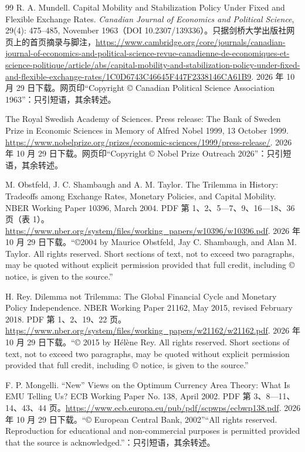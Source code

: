 \begin{thebibliography}{99}
 R. A. Mundell. Capital Mobility and Stabilization Policy Under Fixed and Flexible Exchange Rates. \emph{Canadian Journal of Economics and Political Science}, 29(4): 475--485, November 1963（DOI 10.2307/139336）。只据剑桥大学出版社网页上的首页摘录与脚注，\url{https://www.cambridge.org/core/journals/canadian-journal-of-economics-and-political-science-revue-canadienne-de-economiques-et-science-politique/article/abs/capital-mobility-and-stabilization-policy-under-fixed-and-flexible-exchange-rates/1C0D6743C46645F447F2338146CA61B9}. 2026 年 10 月 29 日下载。网页印“Copyright © Canadian Political Science Association 1963”：只引短语，其余转述。

 The Royal Swedish Academy of Sciences. Press release: The Bank of Sweden Prize in Economic Sciences in Memory of Alfred Nobel 1999, 13 October 1999. \url{https://www.nobelprize.org/prizes/economic-sciences/1999/press-release/}. 2026 年 10 月 29 日下载。网页印“Copyright © Nobel Prize Outreach 2026”：只引短语，其余转述。

 M. Obstfeld, J. C. Shambaugh and A. M. Taylor. The Trilemma in History: Tradeoffs among Exchange Rates, Monetary Policies, and Capital Mobility. NBER Working Paper 10396, March 2004. PDF 第 1、2、5—7、9、16—18、36 页（表 1）。\url{https://www.nber.org/system/files/working_papers/w10396/w10396.pdf}. 2026 年 10 月 29 日下载。“©2004 by Maurice Obstfeld, Jay C. Shambaugh, and Alan M. Taylor. All rights reserved. Short sections of text, not to exceed two paragraphs, may be quoted without explicit permission provided that full credit, including © notice, is given to the source.”

 H. Rey. Dilemma not Trilemma: The Global Financial Cycle and Monetary Policy Independence. NBER Working Paper 21162, May 2015, revised February 2018. PDF 第 1、2、19、22 页。\url{https://www.nber.org/system/files/working_papers/w21162/w21162.pdf}. 2026 年 10 月 29 日下载。“© 2015 by Hélène Rey. All rights reserved. Short sections of text, not to exceed two paragraphs, may be quoted without explicit permission provided that full credit, including © notice, is given to the source.”

 F. P. Mongelli. ``New'' Views on the Optimum Currency Area Theory: What Is EMU Telling Us? ECB Working Paper No. 138, April 2002. PDF 第 3、8—11、14、43、44 页。\url{https://www.ecb.europa.eu/pub/pdf/scpwps/ecbwp138.pdf}. 2026 年 10 月 29 日下载。“© European Central Bank, 2002”“All rights reserved. Reproduction for educational and non-commercial purposes is permitted provided that the source is acknowledged.”：只引短语，其余转述。


\end{thebibliography}
